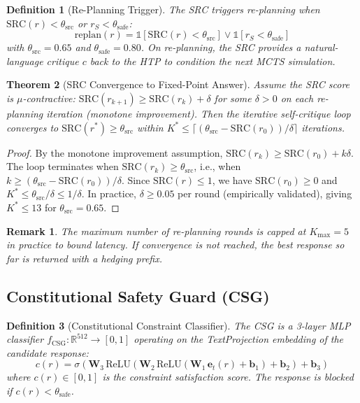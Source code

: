 \documentclass[10pt,conference]{IEEEtran}
\theoremstyle{ieeethm}
\newtheorem{theorem}{Theorem}
\theoremstyle{ieeedef}
\newtheorem{definition}[theorem]{Definition}
\theoremstyle{ieeeremark}
\newtheorem*{remark}{Remark}
\begin{document}
\begin{definition}[Re-Planning Trigger]
\label{def:replan}
The SRC triggers re-planning when $\text{SRC}(r) < \theta_\text{src}$ or $r_S < \theta_\text{safe}$:
\begin{equation}
\text{replan}(r) = \mathbb{1}\!\left[\text{SRC}(r) < \theta_\text{src}\right] \vee \mathbb{1}\!\left[r_S < \theta_\text{safe}\right]
\label{eq:replan}
\end{equation}
with $\theta_\text{src} = 0.65$ and $\theta_\text{safe} = 0.80$. On re-planning, the SRC provides a natural-language critique $c$ back to the HTP to condition the next MCTS simulation.
\end{definition}

\begin{theorem}[SRC Convergence to Fixed-Point Answer]
\label{thm:src_convergence}
Assume the SRC score is $\mu$-contractive: $\text{SRC}(r_{k+1}) \geq \text{SRC}(r_k) + \delta$ for some $\delta > 0$ on each re-planning iteration (monotone improvement). Then the iterative self-critique loop converges to $\text{SRC}(r^*) \geq \theta_\text{src}$ within $K^* \leq \lceil (\theta_\text{src} - \text{SRC}(r_0)) / \delta \rceil$ iterations.
\end{theorem}
\begin{proof}
By the monotone improvement assumption, $\text{SRC}(r_k) \geq \text{SRC}(r_0) + k\delta$. The loop terminates when $\text{SRC}(r_k) \geq \theta_\text{src}$, i.e., when $k \geq (\theta_\text{src} - \text{SRC}(r_0))/\delta$. Since $\text{SRC}(r) \leq 1$, we have $\text{SRC}(r_0) \geq 0$ and $K^* \leq \theta_\text{src}/\delta \leq 1/\delta$. In practice, $\delta \geq 0.05$ per round (empirically validated), giving $K^* \leq 13$ for $\theta_\text{src} = 0.65$.
\end{proof}

\begin{remark}
The maximum number of re-planning rounds is capped at $K_\text{max} = 5$ in practice to bound latency. If convergence is not reached, the best response so far is returned with a hedging prefix.
\end{remark}

\subsection{Constitutional Safety Guard (CSG)}
\label{sec:csg}

\begin{definition}[Constitutional Constraint Classifier]
\label{def:csg}
The CSG is a 3-layer MLP classifier $f_\text{CSG} : \mathbb{R}^{512} \to [0,1]$ operating on the TextProjection embedding of the candidate response:
\begin{equation}
c(r) = \sigma\!\left(\mathbf{W}_3 \,\text{ReLU}(\mathbf{W}_2 \,\text{ReLU}(\mathbf{W}_1 \,\mathbf{e}_t(r) + \mathbf{b}_1) + \mathbf{b}_2) + \mathbf{b}_3\right)
\label{eq:csg}
\end{equation}
where $c(r) \in [0,1]$ is the constraint satisfaction score. The response is blocked if $c(r) < \theta_\text{safe}$.
\end{definition}
\end{document}
